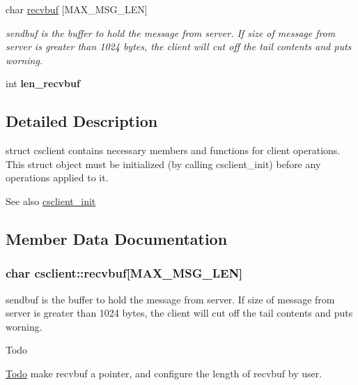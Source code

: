 \begin{DoxyCompactItemize}
\item 
char \hyperlink{structcsclient_a1ae9e95e2f7cb12d129776b0269ddae0}{recvbuf} \mbox{[}M\+A\+X\+\_\+\+M\+S\+G\+\_\+\+L\+E\+N\mbox{]}
\begin{DoxyCompactList}\small\item\em sendbuf is the buffer to hold the message from server. If size of message from server is greater than 1024 bytes, the client will cut off the tail contents and puts worning. \end{DoxyCompactList}\item 
\hypertarget{structcsclient_aad557f6df33e8820d04560ac9cbdfa5f}{}int {\bfseries len\+\_\+recvbuf}\label{structcsclient_aad557f6df33e8820d04560ac9cbdfa5f}

\end{DoxyCompactItemize}


\subsection{Detailed Description}
struct csclient contains necessary members and functions for client operations. This struct object must be initialized (by calling csclient\+\_\+init) before any operations applied to it. 

\begin{DoxySeeAlso}{See also}
\hyperlink{client_8h_a5aa275fcd29cc40dc4e8b04aca4836a8}{csclient\+\_\+init} 
\end{DoxySeeAlso}


\subsection{Member Data Documentation}
\hypertarget{structcsclient_a1ae9e95e2f7cb12d129776b0269ddae0}{}
\subsubsection[{recvbuf}]{\setlength{\rightskip}{0pt plus 5cm}char csclient\+::recvbuf\mbox{[}M\+A\+X\+\_\+\+M\+S\+G\+\_\+\+L\+E\+N\mbox{]}}\label{structcsclient_a1ae9e95e2f7cb12d129776b0269ddae0}


sendbuf is the buffer to hold the message from server. If size of message from server is greater than 1024 bytes, the client will cut off the tail contents and puts worning. 

\begin{DoxyRefDesc}{Todo}
\item[\hyperlink{todo__todo000002}{Todo}]make recvbuf a pointer, and configure the length of recvbuf by user. \end{DoxyRefDesc}
\hypertarget{structcsclient_a325006ca2b5e74fe78e00847974234e5}{}
